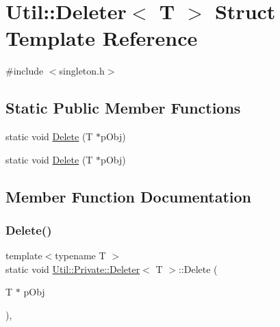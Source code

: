 \hypertarget{structUtil_1_1Private_1_1Deleter}{}\section{Util\+:\+:Deleter$<$ T $>$ Struct Template Reference}
\label{structUtil_1_1Private_1_1Deleter}


{\ttfamily \#include $<$singleton.\+h$>$}

\subsection*{Static Public Member Functions}
\begin{DoxyCompactItemize}
\item 
static void \mbox{\hyperlink{structUtil_1_1Private_1_1Deleter_adcc10f3684fbff2ca9a16827f30994b4}{Delete}} (T $\ast$p\+Obj)
\item 
static void \mbox{\hyperlink{structUtil_1_1Private_1_1Deleter_adcc10f3684fbff2ca9a16827f30994b4}{Delete}} (T $\ast$p\+Obj)
\end{DoxyCompactItemize}


\subsection{Member Function Documentation}
\mbox{\label{structUtil_1_1Private_1_1Deleter_adcc10f3684fbff2ca9a16827f30994b4}} 
\subsubsection{\texorpdfstring{Delete()}{Delete()}\hspace{0.1cm}{\footnotesize\ttfamily [1/2]}}
{\footnotesize\ttfamily template$<$typename T $>$ \\
static void \mbox{\hyperlink{structUtil_1_1Private_1_1Deleter}{Util\+::\+Private\+::\+Deleter}}$<$ T $>$\+::Delete (\begin{DoxyParamCaption}\item[{T $\ast$}]{p\+Obj }\end{DoxyParamCaption})\hspace{0.3cm}{\ttfamily [inline]}, {\ttfamily [static]}}

